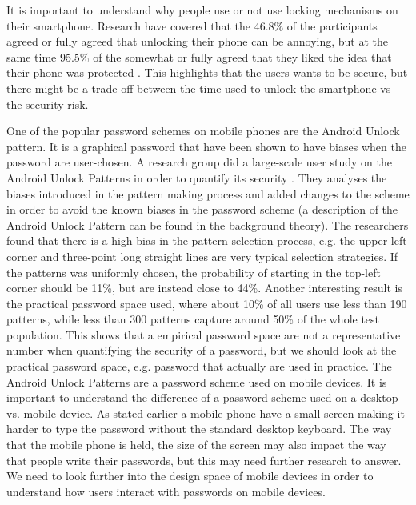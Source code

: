   It is important to understand why people use or not use locking mechanisms on their smartphone. Research have covered that the 46.8\% of the participants agreed or fully agreed that unlocking their phone can be annoying, but at the same time 95.5\% of the somewhat or fully agreed that they liked the idea that their phone was protected \cite{habits3}. This highlights that the users wants to be secure, but there might be a trade-off between the time used to unlock the smartphone vs the security risk.

  One of the popular password schemes on mobile phones are the Android Unlock pattern. It is a graphical password that have been shown to have biases when the password are user-chosen. A research group did a large-scale user study on the Android Unlock Patterns in order to quantify its security \cite{Uellenbeck}. They analyses the biases introduced in the pattern making process and added changes to the scheme in order to avoid the known biases in the password scheme (a description of the Android Unlock Pattern can be found in the background theory). The researchers found that there is a high bias in the pattern selection process, e.g. the upper left corner and three-point long straight lines are very typical selection strategies. If the patterns was uniformly chosen, the probability of starting in the top-left corner should be 11\%, but are instead close to 44\%. Another interesting result is the practical password space used, where about 10\% of all users use less than 190 patterns, while less than 300 patterns capture around 50\% of the whole test population. This shows that a empirical password space are not a representative number when quantifying the security of a password, but we should look at the practical password space, e.g. password that actually are used in practice. The Android Unlock Patterns are a password scheme used on mobile devices. It is important to understand the difference of a password scheme used on a desktop vs. mobile device. As stated earlier a mobile phone have a small screen making it harder to type the password without the standard desktop keyboard. The way that the mobile phone is held, the size of the screen may also impact the way that people write their passwords, but this may need further research to answer. We need to look further into the design space of mobile devices in order to understand how users interact with passwords on mobile devices. 

  